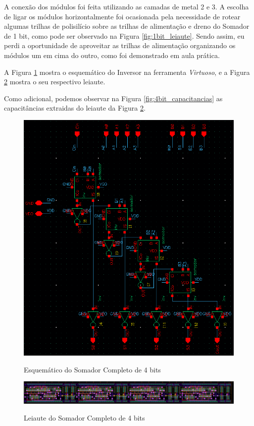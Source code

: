 \documentclass{iiufrgs}
\newcommand{\virtuoso}{\textit{Virtuoso}}
\begin{document}
A conexão dos módulos foi feita utilizando as camadas de metal 2 e 3. A escolha de ligar os módulos horizontalmente foi ocasionada pela necessidade de rotear algumas trilhas de polisilício sobre as trilhas de alimentação e dreno do Somador de 1 bit, como pode ser observado na Figura \ref{fig:1bit_leiaute}. Sendo assim, eu perdi a oportunidade de aproveitar as trilhas de alimentação organizando os módulos um em cima do outro, como foi demonstrado em aula prática.

A Figura \ref{fig:4bit_esquematico} mostra o esquemático do Inversor na ferramenta \virtuoso, e a Figura \ref{fig:4bit_leiaute} mostra o seu respectivo leiaute.

Como adicional, podemos observar na Figura \ref{fig:4bit_capacitancias} as capacitâncias extraidas do leiaute da Figura \ref{fig:4bit_leiaute}.

\begin{figure}[htbp]
    \centering
    \caption{Esquemático do Somador Completo de 4 bits}
    \includegraphics[scale=0.7]{images/schem_4bit.png}
    \label{fig:4bit_esquematico}
\end{figure}

\begin{figure}[htbp]
    \centering
    \caption{Leiaute do Somador Completo de 4 bits}
    \includegraphics[scale=0.175]{images/layout_4bit.png}
    \label{fig:4bit_leiaute}
\end{figure}
\end{document}
